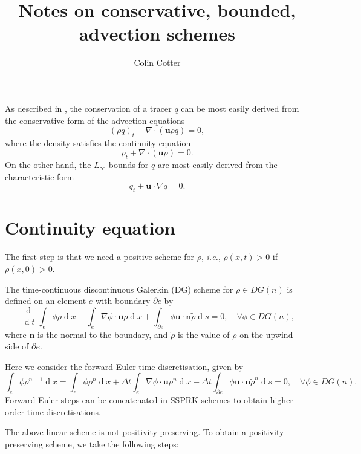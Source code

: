 \documentclass{article}
\def\MM#1{\boldsymbol{#1}}
\newcommand{\dd}[2]{\frac{\diff#1}{\diff#2}}
\def\MM#1{\boldsymbol{#1}}
\DeclareMathOperator{\diff}{d}
\begin{document}
\title{Notes on conservative, bounded, advection schemes}
\author{Colin Cotter}
\maketitle

As described in \cite{thuburn1996multidimensional}, the conservation
of a tracer $q$ can be most easily derived from the conservative form 
of the advection equations
\begin{equation}
(\rho q)_t + \nabla\cdot(\MM{u}\rho q)=0,
\end{equation}
where the density satisfies the continuity equation
\begin{equation}
\rho_t + \nabla\cdot(\MM{u}\rho) = 0.
\end{equation}
On the other hand, the $L_\infty$ bounds for $q$ are most easily derived
from the characteristic form
\begin{equation}
q_t + \MM{u}\cdot\nabla q = 0.
\end{equation}

\section{Continuity equation}
The first step is that we need a positive scheme for $\rho$,
\emph{i.e.}, $\rho(x,t)>0$ if $\rho(x,0)>0$. 

The time-continuous discontinuous Galerkin (DG) scheme for $\rho \in
DG(n)$ is defined on an element $e$ with boundary $\partial e$ by
\begin{equation}
\dd{}{t}\int_e \phi \rho \diff x - \int_e \nabla \phi \cdot\MM{u} \rho\diff x
+ \int_{\partial e} \phi \MM{u}\cdot\MM{n} \tilde{\rho} \diff s = 0,
\quad \forall \phi \in DG(n), 
\end{equation}
where $\MM{n}$ is the normal to the boundary, and $\tilde{\rho}$ is
the value of $\rho$ on the upwind side of $\partial e$.

Here we consider the forward Euler time discretisation, given by
\begin{equation}
\int_e \phi \rho^{n+1} \diff x 
= \int_e \phi \rho^n \diff x 
+ \Delta t \int_e \nabla \phi \cdot\MM{u} \rho^n\diff x
- \Delta t\int_{\partial e} \phi \MM{u}\cdot\MM{n} \tilde{\rho}^n \diff s = 0,
\quad \forall \phi \in DG(n).
\end{equation}
Forward Euler steps can be concatenated in SSPRK schemes to obtain 
higher-order time discretisations.

The above linear scheme is not positivity-preserving. To obtain a
positivity-preserving scheme, we take the following steps:
\end{document}

